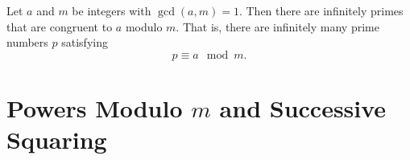 \documentclass[10pt]{article}
\begin{document}
\begin{comment}
\begin{theorem}[Infinitude of Primes $3 \mod{4}$]
    There are infinitely many primes that are congruent to $3$ modulo $4$.
\end{theorem}
\end{comment}

\begin{theorem}[\textcolor{red}{Dirichlet's Theorem on Primes in Arithmetic Progression}]
    Let $a$ and $m$ be integers with $\gcd(a,m)=1$. Then there are infinitely primes that are congruent to $a$ modulo $m$. That is, there are infinitely many prime numbers $p$ satisfying
    \[p \equiv a \mod{m}.\]
\end{theorem}

\begin{comment}
\section{Counting Primes}

\begin{theorem}[The Prime Number Theorem]
    When $x$ is large, the number of primes less than $x$ is approximately equal to $x/\ln(x)$. In other words,
    \[\lim_{x \to \infty} \frac{\pi(x)}{x/\ln(x)}=1.\]
\end{theorem}

\setcounter{conjecture}{1}
\begin{conjecture}[Goldbach's Conjecture]
    Every even number $n \geq 4$ is a sum of two primes.
\end{conjecture}

\begin{conjecture}[Twin Primes Conjecture]
There are infinitely many prime numbers $p$ such that $p+2$ is also prime.
\end{conjecture}
\end{comment}

\setcounter{section}{15}
\section{Powers Modulo $m$ and Successive Squaring}
\end{document}
